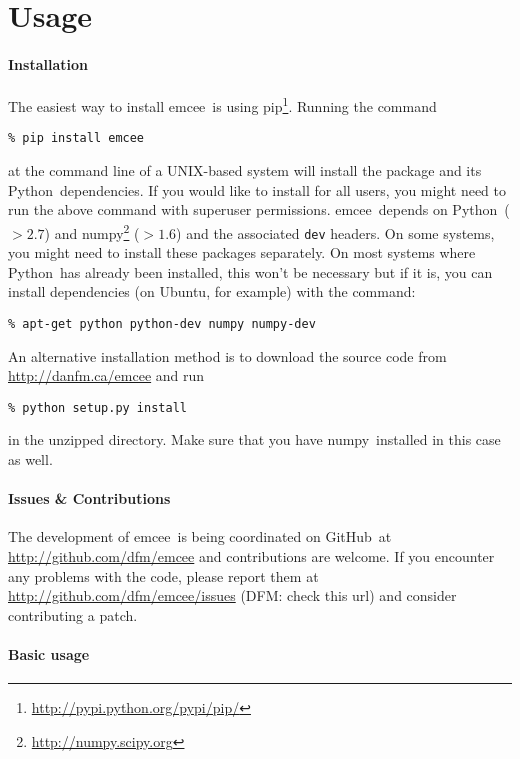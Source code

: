 \documentclass[12pt,preprint]{aastex}
\newcommand{\project}[1]{{\sffamily #1}}
\newcommand{\Python}{\project{Python}}
\newcommand{\numpy}{\project{numpy}}
\newcommand{\Ubuntu}{\project{Ubuntu}}
\newcommand{\github}{\project{GitHub}}
\newcommand{\pip}{\project{pip}}
\newcommand{\thisplain}{emcee}
\newcommand{\this}{\project{\thisplain}}
\newcommand{\sectlabel}[1]{\label{sect:#1}}
\begin{document}
\clearpage
\appendix

\section{Usage}\sectlabel{api}

\paragraph{Installation}

The easiest way to install \this\ is using
\pip\footnote{\url{http://pypi.python.org/pypi/pip/}}. Running the command
\begin{lstlisting}
% pip install emcee
\end{lstlisting}
at the command line of a UNIX-based system will install the package and its
\Python\ dependencies. If you would like to install for all users, you might
need to run the above command with superuser permissions. \this\ depends on
\Python\ ($>2.7$) and \numpy\footnote{\url{http://numpy.scipy.org}} ($>1.6$)
and the associated \texttt{dev} headers. On some systems, you might need to
install these packages separately. On most systems where \Python\ has already
been installed, this won't be necessary but if it is, you can install
dependencies (on \Ubuntu, for example) with the command:
\begin{lstlisting}
% apt-get python python-dev numpy numpy-dev
\end{lstlisting}

An alternative installation method is to download the source code from
\url{http://danfm.ca/emcee} and run
\begin{lstlisting}
% python setup.py install
\end{lstlisting}
in the unzipped directory. Make sure that you have \numpy\ installed in this
case as well.

\paragraph{Issues \& Contributions}

The development of \this\ is being coordinated on \github\ at
\url{http://github.com/dfm/emcee} and contributions are welcome. If you
encounter any problems with the code, please report them at
\url{http://github.com/dfm/emcee/issues} (DFM: check this url) and consider
contributing a patch.

\paragraph{Basic usage}
\end{document}

